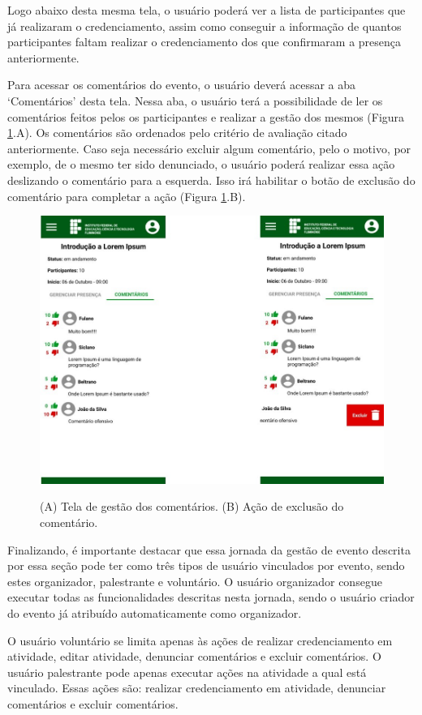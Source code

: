 Logo abaixo desta mesma tela, o usuário poderá ver a lista de participantes que já realizaram o credenciamento, assim como conseguir a informação de quantos participantes faltam realizar o credenciamento dos que confirmaram a presença anteriormente.

Para acessar os comentários do evento, o usuário deverá acessar a aba ‘Comentários’ desta tela. Nessa aba, o usuário terá a possibilidade de ler os comentários feitos pelos os participantes e realizar a gestão dos mesmos (Figura \ref{fig:gestao17}.A). Os comentários são ordenados pelo critério de avaliação citado anteriormente. Caso seja necessário excluir algum comentário, pelo o motivo, por exemplo, de o mesmo ter sido denunciado, o usuário poderá realizar essa ação deslizando o comentário para a esquerda. Isso irá habilitar o botão de exclusão do comentário para completar a ação (Figura \ref{fig:gestao17}.B).

\begin{figure}[H]
    \centering
    \caption{(A) Tela de gestão dos comentários. (B) Ação de exclusão do comentário.}
    \includegraphics[scale=0.63]{figuras/Gestao/17-18.jpg}
    \label{fig:gestao17}
\end{figure}

Finalizando, é importante destacar que essa jornada da gestão de evento descrita por essa seção pode ter como três tipos de usuário vinculados por evento, sendo estes organizador, palestrante e voluntário. O usuário organizador consegue executar todas as funcionalidades descritas nesta jornada, sendo o usuário criador do evento já atribuído automaticamente como organizador. 

O usuário voluntário se limita apenas às ações de realizar credenciamento em atividade, editar atividade, denunciar comentários e excluir comentários. O usuário palestrante pode apenas executar ações na atividade a qual está vinculado. Essas ações são:  realizar credenciamento em atividade, denunciar comentários e excluir comentários.

